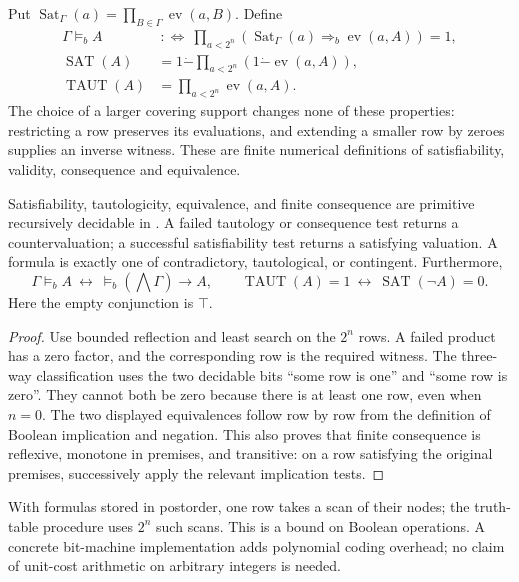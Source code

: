 Put $\operatorname{Sat}_\Gamma(a)=\prod_{B\in\Gamma}\operatorname{ev}(a,B)$.
Define
\[
\begin{split}
 \Gamma\models_b A&\ :\!\Longleftrightarrow\
   \prod_{a<2^n}(\operatorname{Sat}_\Gamma(a)\Rightarrow_b
                         \operatorname{ev}(a,A))=1,\\
 \operatorname{SAT}(A)&=1\mathbin{\dot-}\prod_{a<2^n}(1\mathbin{\dot-}\operatorname{ev}(a,A)),\\
 \operatorname{TAUT}(A)&=\prod_{a<2^n}\operatorname{ev}(a,A).
\end{split}
\]
The choice of a larger covering support changes none of these properties:
restricting a row preserves its evaluations, and extending a smaller row by
zeroes supplies an inverse witness. These are finite numerical definitions
of satisfiability, validity, consequence and equivalence.

\begin{theorem}\label{thm:truth-decision}
Satisfiability, tautologicity, equivalence, and finite consequence are
primitive recursively decidable in \ipra. A failed tautology or consequence
test returns a countervaluation; a successful satisfiability test returns a
satisfying valuation. A formula is exactly one of contradictory, tautological,
or contingent. Furthermore,
\[
 \Gamma\models_b A\ \leftrightarrow\
 \models_b(\bigwedge\Gamma)\to A,
 \qquad
 \operatorname{TAUT}(A)=1\ \leftrightarrow\ \operatorname{SAT}(\neg A)=0.
\]
Here the empty conjunction is $\top$.
\end{theorem}
\begin{proof}
Use bounded reflection and least search on the $2^n$ rows. A failed product
has a zero factor, and the corresponding row is the required witness. The
three-way classification uses the two decidable bits ``some row is one''
and ``some row is zero''. They cannot both be zero because there is at least
one row, even when $n=0$. The two displayed equivalences follow row by row
from the definition of Boolean implication and negation. This also proves
that finite consequence is reflexive, monotone in premises, and transitive:
on a row satisfying the original premises, successively apply the relevant
implication tests.
\end{proof}

With formulas stored in postorder, one row takes a scan of their nodes;
the truth-table procedure uses $2^n$ such scans. This is a bound on Boolean
operations. A concrete bit-machine implementation adds polynomial coding
overhead; no claim of unit-cost arithmetic on arbitrary integers is needed.

